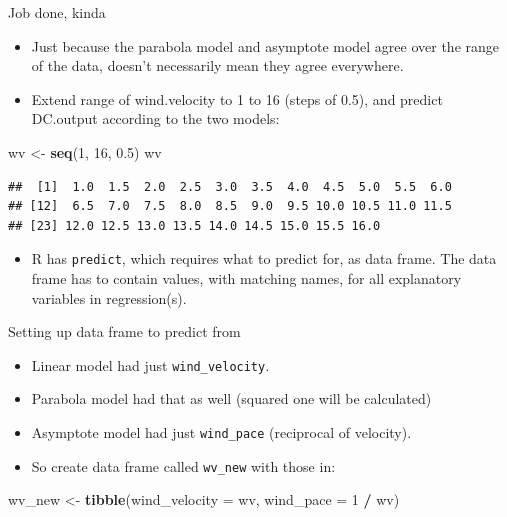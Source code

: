 \documentclass[ignorenonframetext,]{beamer}
\newenvironment{Shaded}{\begin{snugshade}}{\end{snugshade}}
\newcommand{\DataTypeTok}[1]{\textcolor[rgb]{0.13,0.29,0.53}{#1}}
\newcommand{\DecValTok}[1]{\textcolor[rgb]{0.00,0.00,0.81}{#1}}
\newcommand{\FloatTok}[1]{\textcolor[rgb]{0.00,0.00,0.81}{#1}}
\newcommand{\KeywordTok}[1]{\textcolor[rgb]{0.13,0.29,0.53}{\textbf{#1}}}
\newcommand{\NormalTok}[1]{#1}
\newcommand{\OperatorTok}[1]{\textcolor[rgb]{0.81,0.36,0.00}{\textbf{#1}}}
\newcommand{\StringTok}[1]{\textcolor[rgb]{0.31,0.60,0.02}{#1}}
\providecommand{\tightlist}{%
  \setlength{\itemsep}{0pt}\setlength{\parskip}{0pt}}
\begin{document}
\begin{frame}[fragile]{Job done, kinda}
\protect\hypertarget{job-done-kinda}{}

\begin{itemize}
\tightlist
\item
  Just because the parabola model and asymptote model agree over the
  range of the data, doesn't necessarily mean they agree everywhere.
\item
  Extend range of wind.velocity to 1 to 16 (steps of 0.5), and predict
  DC.output according to the two models:
\end{itemize}

\begin{Shaded}
\begin{Highlighting}[]
\NormalTok{wv <-}\StringTok{ }\KeywordTok{seq}\NormalTok{(}\DecValTok{1}\NormalTok{, }\DecValTok{16}\NormalTok{, }\FloatTok{0.5}\NormalTok{)}
\NormalTok{wv}
\end{Highlighting}
\end{Shaded}

\begin{verbatim}
##  [1]  1.0  1.5  2.0  2.5  3.0  3.5  4.0  4.5  5.0  5.5  6.0
## [12]  6.5  7.0  7.5  8.0  8.5  9.0  9.5 10.0 10.5 11.0 11.5
## [23] 12.0 12.5 13.0 13.5 14.0 14.5 15.0 15.5 16.0
\end{verbatim}

\begin{itemize}
\tightlist
\item
  R has \texttt{predict}, which requires what to predict for, as data
  frame. The data frame has to contain values, with matching names, for
  all explanatory variables in regression(s).
\end{itemize}

\end{frame}

\begin{frame}[fragile]{Setting up data frame to predict from}
\protect\hypertarget{setting-up-data-frame-to-predict-from}{}

\begin{itemize}
\tightlist
\item
  Linear model had just \texttt{wind\_velocity}.
\item
  Parabola model had that as well (squared one will be calculated)
\item
  Asymptote model had just \texttt{wind\_pace} (reciprocal of velocity).
\item
  So create data frame called \texttt{wv\_new} with those in:
\end{itemize}

\begin{Shaded}
\begin{Highlighting}[]
\NormalTok{wv_new <-}\StringTok{ }\KeywordTok{tibble}\NormalTok{(}\DataTypeTok{wind_velocity =}\NormalTok{ wv, }\DataTypeTok{wind_pace =} \DecValTok{1} \OperatorTok{/}\StringTok{ }\NormalTok{wv)}
\end{Highlighting}
\end{Shaded}

\end{frame}
\end{document}
